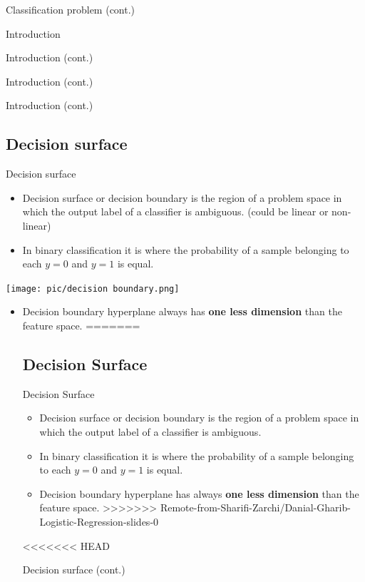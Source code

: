 \documentclass[serif, aspectratio=169]{beamer}
\begin{document}
\begin{frame}{Classification problem (cont.)}
\begin{itemize}
\begin{frame}{Introduction}
\begin{itemize}
\begin{frame}{Introduction (cont.)}
\begin{frame}{Introduction (cont.)}
\begin{frame}{Introduction (cont.)}
\subsection{Decision surface}
\begin{frame}{Decision surface}
    \begin{itemize}
      \item Decision surface or decision boundary is the region of a problem space in which the output label of a classifier is ambiguous. (could be linear or non-linear)
      \item In binary classification it is where the probability of a sample belonging to each $y=0$ and $y=1$ is equal.
    \end{itemize}
    
    
     \begin{center}
        \texttt{[image: pic/decision boundary.png]}
    \end{center}
    
    \begin{itemize}
        
      \item Decision boundary hyperplane always has \textbf{one less dimension} than the feature space.
=======
\subsection{Decision Surface}
\begin{frame}{Decision Surface}
    \begin{itemize}
      \item Decision surface or decision boundary is the region of a problem space in which the output label of a classifier is ambiguous.
      \item In binary classification it is where the probability of a sample belonging to each $y=0$ and $y=1$ is equal.
      \item Decision boundary hyperplane has always 
      \textbf{one less dimension} than the feature space.
>>>>>>> Remote-from-Sharifi-Zarchi/Danial-Gharib-Logistic-Regression-slides-0
      
      
      
     
    \end{itemize}
\end{frame}
<<<<<<< HEAD
\begin{frame}{Decision surface (cont.)}


\end{frame}
\end{itemize}
\end{frame}
\end{frame}
\end{frame}
\end{frame}
\end{itemize}
\end{frame}
\end{itemize}
\end{frame}
\end{document}
